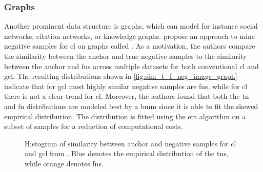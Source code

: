 \subsubsection{Graphs}\label{subsec:graph_distribution}

Another prominent data structure is graphs, which can model 
for instance social networks, citation networks, or knowledge graphs.
\citet{progcl_2022} propose an approach to mine negative samples for \ac{cl} on graphs called \progcl{}. 
As a motivation, the authors compare the similarity between the anchor and true negative samples 
to the similarity between the anchor and \acp{fn} 
across multiple datasets for both conventional \ac{cl} and \ac{gcl}.
The resulting distributions shown in \autoref{fig:sim_t_f_neg_image_graph} 
indicate that for \ac{gcl} most highly similar negative samples are \acp{fn}, 
while for \ac{cl} there is not a clear trend for \ac{cl}.
Moreover, the authors found that both the \ac{tn} and \ac{fn} distributions are modeled best by a \ac{bmm} 
since it is able to fit the skewed empirical distribution.
The distribution is fitted using the \ac{em} algorithm on a subset of samples for a reduction of computational costs.

\begin{figure}%
    \centering
    \qquad
    \caption{Histogram of similarity between anchor and negative samples for \ac{cl} and \ac{gcl} from \citet{progcl_2022}.
    Blue denotes the empirical distribution of the \acp{tn}, while orange denotes \acp{fn}.}%
    \label{fig:sim_t_f_neg_image_graph}%
\end{figure}

